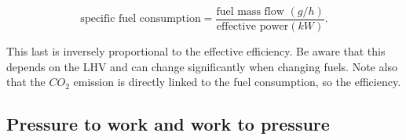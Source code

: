	\begin{equation}
	\mbox{specific fuel consumption} = \frac{\mbox{fuel mass flow }(g/h)}{\mbox{effective power} (kW)}.
	\end{equation}
	
	This last is inversely proportional to the effective efficiency. Be aware that this depends on the LHV and can change significantly when changing fuels. Note also that the $CO_2$ emission is directly linked to the fuel consumption, so the efficiency. 
	
\subsection{Pressure to work and work to pressure}
	
	
	